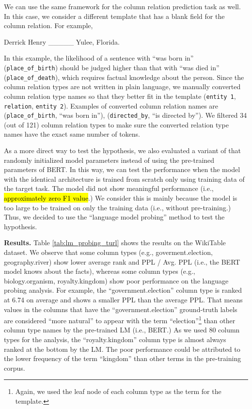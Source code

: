 We can use the same framework for the column relation prediction task as well. In this case, we consider a different template that has a blank field for the column relation. For example,
%
\begin{center}
    Derrick Henry \_\_\_\_\_ Yulee, Florida.
\end{center}
%
In this example, the likelihood of a sentence with ``was born in'' ({\tt place\_of\_birth}) should be judged higher than that with ``was died in'' ({\tt place\_of\_death}), which requires factual knowledge about the person. Since the column relation types are not written in plain language, we manually converted column relation type names so that they better fit in the template ({\tt entity 1}, {\tt relation}, {\tt entity 2}). Examples of converted column relation names are ({\tt place\_of\_birth}, ``was born in''), 
({\tt directed\_by}, ``is directed by''). We filtered 34 (out of 121) column relation types to make sure the converted relation type names have the exact same number of tokens. 


As a more direct way to test the hypothesis, we also evaluated a variant of \name{} that randomly initialized model parameters instead of using the pre-trained parameters of BERT. In this way, we can test the performance when the model with the identical architecture is trained from scratch only using training data of the target task. The model did not show meaningful performance (i.e., \hl{approximately zero F1 value}.)
%
We consider this is mainly because the model is too large to be trained on only the training data (i.e., without pre-training.) Thus, we decided to use the ``language model probing'' method to test the hypothesis.


\smallskip
\noindent
{\bf Results.} Table \ref{tab:lm_probing_turl} shows the results on the WikiTable dataset. We observe that some column types (e.g., goverment.election, geography.river) show lower average rank and PPL / Avg. PPL (i.e., the BERT model knows about the facts), whereas some column types (e.g., biology.organism, royalty.kingdom) show poor performance on the language probing analysis.
%
For example, the ``government.election'' column type is ranked at 6.74 on average and shows a smaller PPL than the average PPL. That means values in the columns that have the ``government.election'' ground-truth labels are considered ``more natural'' to appear with the term ``election''\footnote{Again, we used the leaf node of each column type as the term for the template.} than other column type names by the pre-trained LM (i.e., BERT.)
%
As we used 80 column types for the analysis, the ``royalty.kingdom'' column type is almost always ranked at the bottom by the LM. The poor performance could be attributed to the lower frequency of the term ``kingdom'' than other terms in the pre-training corpus.


